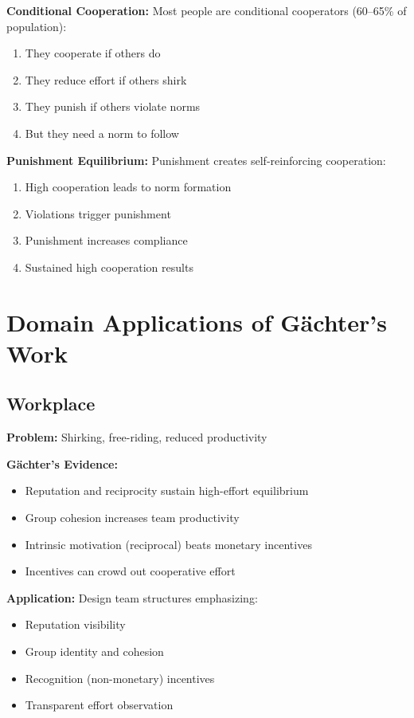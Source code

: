 \documentclass[11pt]{article}
\begin{document}
\textbf{Conditional Cooperation:} Most people are conditional cooperators (60–65\%
of population):
\begin{enumerate}
    \item They cooperate if others do
    \item They reduce effort if others shirk
    \item They punish if others violate norms
    \item But they need a norm to follow
\end{enumerate}

\textbf{Punishment Equilibrium:} Punishment creates self-reinforcing cooperation:
\begin{enumerate}
    \item High cooperation leads to norm formation
    \item Violations trigger punishment
    \item Punishment increases compliance
    \item Sustained high cooperation results
\end{enumerate}

\section*{Domain Applications of Gächter's Work}

\subsection*{Workplace}

\textbf{Problem:} Shirking, free-riding, reduced productivity

\textbf{Gächter's Evidence:}
\begin{itemize}
    \item Reputation and reciprocity sustain high-effort equilibrium
    \item Group cohesion increases team productivity
    \item Intrinsic motivation (reciprocal) beats monetary incentives
    \item Incentives can crowd out cooperative effort
\end{itemize}

\textbf{Application:} Design team structures emphasizing:
\begin{itemize}
    \item Reputation visibility
    \item Group identity and cohesion
    \item Recognition (non-monetary) incentives
    \item Transparent effort observation
\end{itemize}
\end{document}
